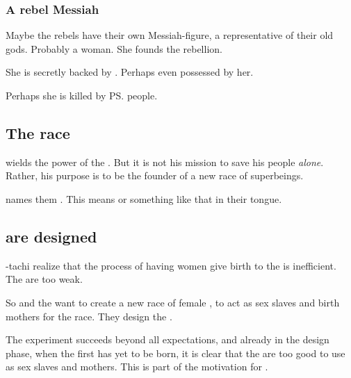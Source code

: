 \subsubsection{A rebel Messiah}
Maybe the rebels have their own Messiah-figure, a representative of their old gods. 
Probably a woman. 
She founds the rebellion. 

She is secretly backed by \Vexstrasshin. 
Perhaps even possessed by her. 

Perhaps she is killed by \ps{\Semiza}{} people. 










\subsection{The \resphan{} race}
\Thanatzil{} wields the power of the \banemessiah. But it is not his mission to save his people \emph{alone}. Rather, his purpose is to be the founder of a new race of \halfbane{} superbeings. 

\Semiza{} names them \resphain. 
This means  or something like that in their tongue. 





\subsection{\Resviel{} are designed}
\Semiza-tachi realize that the process of having \nephilic{} women give birth to the \resphain{} is inefficient. 
The \nephilim{} are too weak. 

So \Semiza{} and the \banelords{} want to create a new race of female \resphain, to act as sex slaves and birth mothers for the \resphan{} race. 
They design the \resviel. 

The \resvil{} experiment succeeds beyond all expectations, and already in the design phase, when the first \resvil{} has yet to be born, it is clear that the \resviel{} are too good to use as sex slaves and mothers. 
This is part of the motivation for .











